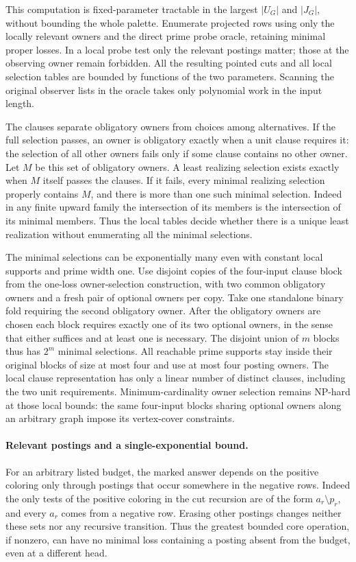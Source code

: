 This computation is fixed-parameter tractable in
the largest $|U_G|$ and $|J_G|$, without bounding
the whole palette. Enumerate projected rows using
only the locally relevant owners and the direct
prime probe oracle, retaining minimal proper
losses. In a local probe test only the relevant
postings matter; those at the observing owner
remain forbidden. All the resulting pointed cuts
and all local selection tables are bounded by
functions of the two parameters. Scanning the
original observer lists in the oracle takes only
polynomial work in the input length.

The clauses separate obligatory owners from choices
among alternatives. If the full selection passes,
an owner is obligatory exactly when a unit clause
requires it: the selection of all other owners
fails only if some clause contains no other owner.
Let $M$ be this set of obligatory owners. A least
realizing selection exists exactly when $M$ itself
passes the clauses. If it fails, every minimal
realizing selection properly contains $M$, and
there is more than one such minimal selection.
Indeed in any finite upward family the intersection
of its members is the intersection of its minimal
members. Thus the local tables decide whether
there is a unique least realization without
enumerating all the minimal selections.

The minimal selections can be exponentially many
even with constant local supports and prime width
one. Use disjoint copies of the four-input clause
block from the one-loss owner-selection construction,
with two common obligatory owners and a fresh pair
of optional owners per copy. Take one standalone
binary fold requiring the second obligatory owner.
After the obligatory owners are chosen each block
requires exactly one of its two optional owners,
in the sense that either suffices and at least one
is necessary. The disjoint union of $m$ blocks thus
has $2^m$ minimal selections. All reachable prime
supports stay inside their original blocks of size
at most four and use at most four posting owners.
The local clause representation has only a linear
number of distinct clauses, including the two unit
requirements. Minimum-cardinality owner selection remains
NP-hard at those local bounds: the same
four-input blocks sharing optional owners along an
arbitrary graph impose its vertex-cover constraints.

\paragraph{Relevant postings and a single-exponential bound.}
For an arbitrary listed budget, the marked answer depends
on the positive coloring only through postings that occur
somewhere in the negative rows. Indeed the only tests of
the positive coloring in the cut recursion are of the
form $a_r\setminus p_r$, and every $a_r$ comes from a
negative row. Erasing other postings changes neither
these sets nor any recursive transition. Thus the
greatest bounded core operation, if nonzero, can have
no minimal loss containing a posting absent from the
budget, even at a different head.

